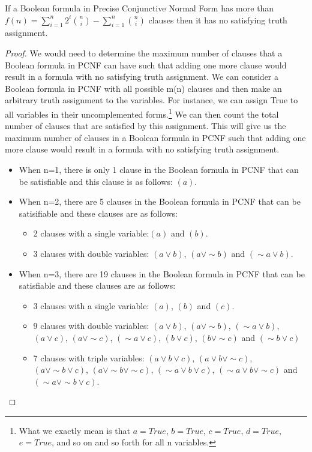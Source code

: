 \documentclass[runningheads,a4paper]{llncs}
\let\oldsim\sim
\renewcommand{\sim}{{\oldsim}}
\begin{document}
\begin{theorem}\normalfont

If a Boolean formula in Precise Conjunctive Normal Form has more than $f(n) = \sum_{i=1}^{n} 2^{i} \binom{n} {i} - \sum_{i=1}^{n} \binom{n} {i}$ clauses then it has no satisfying truth assignment.
\begin{proof} 

We would need to determine the maximum number of clauses that a Boolean formula in PCNF can have such that adding one more clause would result in a formula with no satisfying truth assignment. We can consider a Boolean formula in PCNF with all possible m(n) clauses and then make an arbitrary truth assignment to the variables. For instance, we can assign True to all variables in their uncomplemented forms.\footnote{What we exactly mean is that $a=True$, $b=True$, $c=True$, $d=True$, $e=True$, and so on and so forth for all n variables.} We can then count the total number of clauses that are satisfied by this assignment. This will give us the maximum number of clauses in a Boolean formula in PCNF such that adding one more clause would result in a formula with no satisfying truth assignment. 

\begin{itemize}
\item When n=1, there is only 1 clause in the Boolean formula in PCNF that can be satisfiable and this clause is as follows: $(a)$.
 
\item When n=2, there are 5 clauses in the Boolean formula in PCNF that can be satisifiable and these clauses are as follows:
    \begin{itemize}
    \item 2 clauses with a single variable:$(a)$ and $(b)$.
    \item 3 clauses with double variables: $({a}\vee {b})$, $({a}\vee \sim {b})$ and $(\sim {a}\vee {b})$.
     \end{itemize}
\item When n=3, there are 19 clauses in the Boolean formula in PCNF that can be satisfiable and these clauses are as follows:
    \begin{itemize}
    \item 3 clauses with a single variable: $(a)$, $(b)$ and $(c)$.
    \item 9 clauses with double variables: $({a}\vee {b})$, $({a}\vee \sim {b})$, $(\sim {a}\vee {b})$,  $({a}\vee {c})$, $({a}\vee \sim {c})$, $(\sim {a}\vee {c})$,  $({b}\vee {c})$, $({b}\vee \sim {c})$ and $(\sim {b}\vee {c})$
    \item 7 clauses with triple variables: $({a}\vee {b} \vee {c})$, $({a}\vee {b} \vee \sim {c})$, $({a}\vee \sim {b} \vee {c})$, $({a}\vee \sim {b} \vee \sim {c})$, $(\sim {a}\vee {b} \vee {c})$, $(\sim {a}\vee {b} \vee \sim {c})$ and $( \sim {a}\vee \sim {b} \vee {c})$.
    \end{itemize}
\end{itemize}


\end{proof}
\end{theorem}
\end{document}
